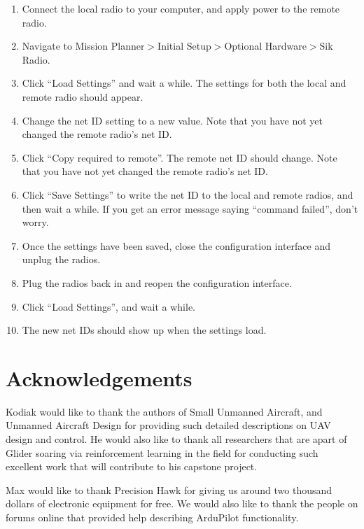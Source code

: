 \documentclass[12pt,journal,compsoc]{IEEEtran}
\begin{document}
\begin{enumerate}
\item Connect the local radio to your computer, and apply power to the remote radio.
\item Navigate to Mission Planner$>$Initial Setup$>$Optional Hardware$>$Sik Radio.
\item Click “Load Settings” and wait a while. The settings for both the local and remote radio should appear. 
\item Change the net ID setting to a new value. Note that you have not yet changed the remote radio’s net ID.
\item Click “Copy required to remote”. The remote net ID should change. Note that you have not yet changed the remote radio’s net ID.
\item Click “Save Settings” to write the net ID to the local and remote radios, and then wait a while. If you get an error message saying “command failed”, don’t worry.
\item Once the settings have been saved, close the configuration interface and unplug the radios.
\item Plug the radios back in and reopen the configuration interface.
\item Click “Load Settings”, and wait a while. 
\item The new net IDs should show up when the settings load.
\end{enumerate}

% 
%

\section*{Acknowledgements}
Kodiak would like to thank the authors of Small Unmanned Aircraft, and Unmanned Aircraft Design for providing such detailed descriptions on UAV design and control. He would also like to thank all researchers that are apart of Glider soaring via reinforcement learning in the field \cite{GliderBirds} for conducting such excellent work that will contribute to his capstone project.

Max would like to thank Precision Hawk for giving us around two thousand dollars of electronic equipment for free. We would also like to thank the people on forums online that provided help describing ArduPilot functionality.
\end{document}
